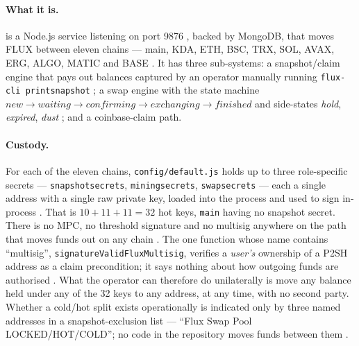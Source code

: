 \paragraph{What it is.} \Fusion is a Node.js service listening on port \num{9876}
, backed by MongoDB, that moves FLUX between eleven chains ---
main, KDA, ETH, BSC, TRX, SOL, AVAX, ERG, ALGO, MATIC and BASE
. It has three sub-systems: a snapshot/claim engine that
pays out balances captured by an operator manually running \texttt{flux-\allowbreak{}cli printsnapshot}
; a swap engine with the state machine
$\textit{new} \to \textit{waiting} \to \textit{confirming} \to \textit{exchanging} \to
\textit{finished}$ and side-states \textit{hold}, \textit{expired}, \textit{dust}
; and a coinbase-claim path. \shipped

\paragraph{Custody.} For each of the eleven chains, \texttt{config/\allowbreak{}default.\allowbreak{}js} holds up to three
role-specific secrets --- \texttt{snapshotsecrets}, \texttt{miningsecrets}, \texttt{swapsecrets} ---
each a single address with a single raw private key, loaded into the process and used to sign
in-process . That is $10 + 11 + 11 = 32$ hot keys, \texttt{main} having no snapshot secret. There
is no MPC, no threshold signature and no multisig anywhere on the path that moves funds out on any
chain 
. The one function whose name contains ``multisig'',
\texttt{signature\allowbreak{}Valid\allowbreak{}Flux\allowbreak{}Multisig}, verifies a \emph{user's} ownership of a P2SH address as a claim
precondition; it says nothing about how outgoing funds are authorised
. What the operator can therefore do
unilaterally is move any balance held under any of the 32 keys to any address, at any time, with no
second party. Whether a cold/hot split exists operationally is indicated only by three named
addresses in a snapshot-exclusion list --- ``Flux Swap Pool LOCKED/HOT/COLD''; no code in the
repository moves funds between them
. \shipped

